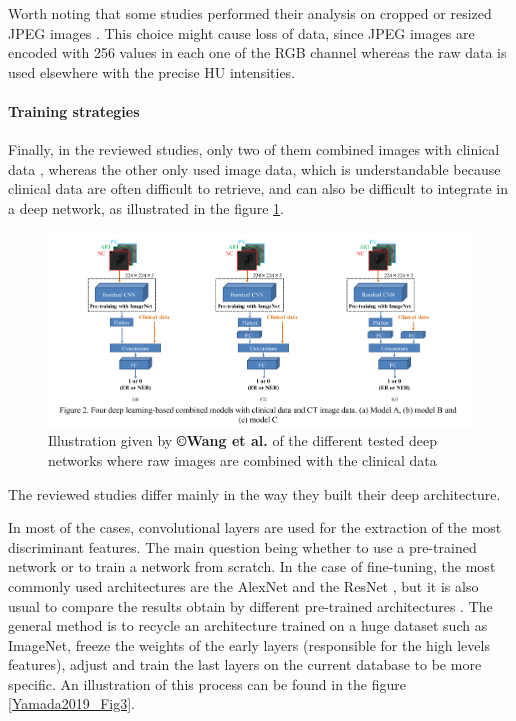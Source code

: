 \documentclass[]{article}
\let\oldparagraph\paragraph
\renewcommand{\paragraph}[1]{\oldparagraph{#1}\mbox{}}
\begin{document}
Worth noting that some studies performed their analysis on cropped or
resized JPEG images \cite{Yasaka2018,Yasaka2018a,WANG2019}. This choice might cause loss of data, since JPEG images are encoded with 256 values in each one of the RGB channel whereas the raw data is used elsewhere with the precise HU intensities.

\paragraph{Training strategies}\label{training-strategies}

Finally, in the reviewed studies, only two of them combined images with
clinical data \cite{Yasaka2018a,WANG2019}, whereas the other only used image data, which is
understandable because clinical data are often difficult to retrieve,
and can also be difficult to integrate in a deep network, as illustrated
in the figure \ref{Wang2019_Fig2}.


\begin{figure}[th!]
\centering
\includegraphics[width=0.7\linewidth]{images/image5}
\caption{Illustration given by \textbf{©Wang et al.} of the different tested deep networks where raw images are combined with the clinical data \cite{WANG2019}}
\label{Wang2019_Fig2}
\end{figure}

The reviewed studies differ mainly in the way they built their deep
architecture.

In most of the cases, convolutional layers are used for the extraction
of the most discriminant features. The main question being whether to
use a pre-trained network or to train a network from scratch. In the
case of fine-tuning, the most commonly used architectures are the
AlexNet and the ResNet \cite{WANG2019,Wang2018,Yamada2019,Peng2020}, but it is also usual to
compare the results obtain by different pre-trained architectures \cite{WANG2019,Yamada2019}. The general method
is to recycle an architecture trained on a huge dataset such as
ImageNet, freeze the weights of the early layers (responsible for the
high levels features), adjust and train the last layers on the current
database to be more specific.
An illustration of this process can be found in the figure \ref{Yamada2019_Fig3}.
\end{document}
